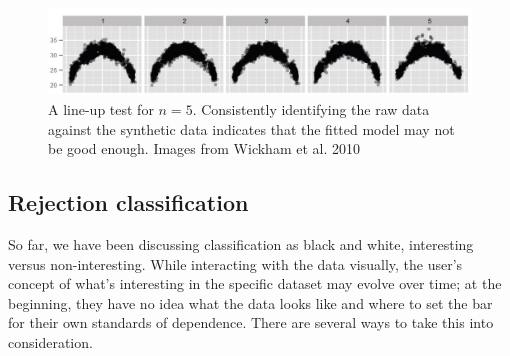 \begin{figure}[htb]
	\begin{center}
		\includegraphics[width=1\linewidth]{ch-visualizer/figures/lineup}
		\caption[A line-up test for $n = 5$. ]{A line-up test for $n = 5$. Consistently identifying the raw data against the synthetic data indicates that the fitted model may not be good enough. Images from Wickham et al. 2010~\cite{wickham2010}}
		\label{fig:visualizer:lineup}
	\end{center}
\end{figure}


\subsection{Rejection classification}

So far, we have been discussing classification as black and white, interesting versus non-interesting. While interacting with the data visually, the user's concept of what's interesting in the specific dataset may evolve over time; at the beginning, they have no idea what the data looks like and where to set the bar for their own standards of dependence. There are several ways to take this into consideration. 

